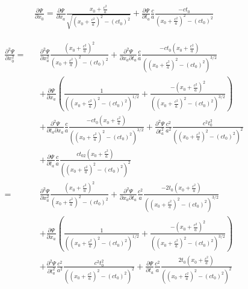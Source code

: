 \documentclass[prd,showpacs,preprint]{revtex4}
\begin{document}
\begin{appendix}
\begin{eqnarray}
\frac{\partial \Psi}{\partial x_0} = \frac{\partial \Psi}{\partial x_a}\frac{x_0+\frac{c^2}{a}}{\sqrt{(x_0+\frac{c^2}{a})^2-(ct_0)^2}} + \frac{\partial \Psi}{\partial t_a}\frac{c}{a}\frac{-ct_0}{(x_0+\frac{c^2}{a})^2-(ct_0)^2}
\label{eqn:Partial_Psi_Partial_x}
\end{eqnarray}

\begin{eqnarray}
\frac{\partial^2 \Psi}{\partial x_0^2} =&& \frac{\partial^2 \Psi}{\partial x_a^2}\frac{(x_0+\frac{c^2}{a})^2}{(x_0+\frac{c^2}{a})^2-(ct_0)^2} + \frac{\partial^2 \Psi}{\partial x_a\partial t_a}\frac{c}{a}\frac{-ct_0(x_0+\frac{c^2}{a})}{((x_0+\frac{c^2}{a})^2-(ct_0)^2)^{3/2}}\nonumber\\
&& + \frac{\partial \Psi}{\partial x_a}(\frac{1}{((x_0+\frac{c^2}{a})^2-(ct_0)^2)^{1/2}} + \frac{-(x_0+\frac{c^2}{a})^2}{((x_0+\frac{c^2}{a})^2-(ct_0)^2)^{3/2}})\nonumber\\
&& + \frac{\partial^2 \Psi}{\partial t_a\partial x_a}\frac{c}{a}\frac{-ct_0(x_0+\frac{c^2}{a})}{((x_0+\frac{c^2}{a})^2-(ct_0)^2)^{3/2}} + \frac{\partial^2 \Psi}{\partial t_a^2}\frac{c^2}{a^2}\frac{c^2t_0^2}{((x_0+\frac{c^2}{a})^2-(ct_0)^2)^2}\nonumber\\
&& + \frac{\partial \Psi}{\partial t_a}\frac{c}{a}\frac{ct_02(x_0+\frac{c^2}{a})}{((x_0+\frac{c^2}{a})^2-(ct_0)^2)^2}\nonumber\\
=&& \frac{\partial^2 \Psi}{\partial x_a^2}\frac{(x_0+\frac{c^2}{a})^2}{(x_0+\frac{c^2}{a})^2-(ct_0)^2} + \frac{\partial^2 \Psi}{\partial x_a\partial t_a}\frac{c^2}{a}\frac{-2t_0(x_0+\frac{c^2}{a})}{((x_0+\frac{c^2}{a})^2-(ct_0)^2)^{3/2}}\nonumber\\
&& + \frac{\partial \Psi}{\partial x_a}(\frac{1}{((x_0+\frac{c^2}{a})^2-(ct_0)^2)^{1/2}} + \frac{-(x_0+\frac{c^2}{a})^2}{((x_0+\frac{c^2}{a})^2-(ct_0)^2)^{3/2}})\nonumber\\
&& + \frac{\partial^2 \Psi}{\partial t_a^2}\frac{c^2}{a^2}\frac{c^2t_0^2}{((x_0+\frac{c^2}{a})^2-(ct_0)^2)^2} + \frac{\partial \Psi}{\partial t_a}\frac{c^2}{a}\frac{2t_0(x_0+\frac{c^2}{a})}{((x_0+\frac{c^2}{a})^2-(ct_0)^2)^2}
\label{app:eqn:Partial2_Psi_Partial_x2}
\end{eqnarray}


\end{appendix}
\end{document}
